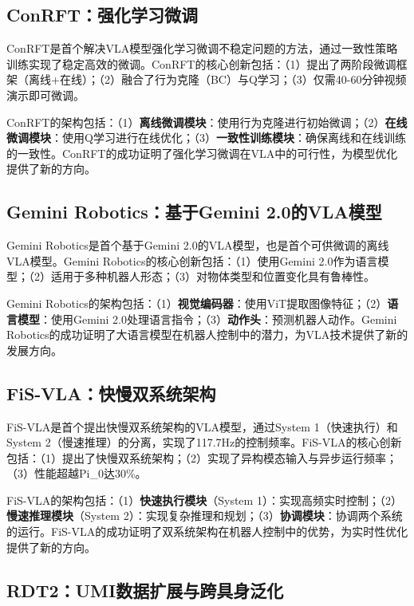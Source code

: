 \documentclass[12pt,a4paper]{article}
\begin{document}
\subsection{ConRFT：强化学习微调}

ConRFT\cite{conrft}是首个解决VLA模型强化学习微调不稳定问题的方法，通过一致性策略训练实现了稳定高效的微调。ConRFT的核心创新包括：（1）提出了两阶段微调框架（离线+在线）；（2）融合了行为克隆（BC）与Q学习；（3）仅需40-60分钟视频演示即可微调。

ConRFT的架构包括：（1）\textbf{离线微调模块}：使用行为克隆进行初始微调；（2）\textbf{在线微调模块}：使用Q学习进行在线优化；（3）\textbf{一致性训练模块}：确保离线和在线训练的一致性。ConRFT的成功证明了强化学习微调在VLA中的可行性，为模型优化提供了新的方向。

\subsection{Gemini Robotics：基于Gemini 2.0的VLA模型}

Gemini Robotics\cite{geminirobotics}是首个基于Gemini 2.0的VLA模型，也是首个可供微调的离线VLA模型。Gemini Robotics的核心创新包括：（1）使用Gemini 2.0作为语言模型；（2）适用于多种机器人形态；（3）对物体类型和位置变化具有鲁棒性。

Gemini Robotics的架构包括：（1）\textbf{视觉编码器}：使用ViT提取图像特征；（2）\textbf{语言模型}：使用Gemini 2.0处理语言指令；（3）\textbf{动作头}：预测机器人动作。Gemini Robotics的成功证明了大语言模型在机器人控制中的潜力，为VLA技术提供了新的发展方向。

\subsection{FiS-VLA：快慢双系统架构}

FiS-VLA\cite{fisvla}是首个提出快慢双系统架构的VLA模型，通过System 1（快速执行）和System 2（慢速推理）的分离，实现了117.7Hz的控制频率。FiS-VLA的核心创新包括：（1）提出了快慢双系统架构；（2）实现了异构模态输入与异步运行频率；（3）性能超越Pi\_0达30\%。

FiS-VLA的架构包括：（1）\textbf{快速执行模块}（System 1）：实现高频实时控制；（2）\textbf{慢速推理模块}（System 2）：实现复杂推理和规划；（3）\textbf{协调模块}：协调两个系统的运行。FiS-VLA的成功证明了双系统架构在机器人控制中的优势，为实时性优化提供了新的方向。

\subsection{RDT2：UMI数据扩展与跨具身泛化}
\end{document}
